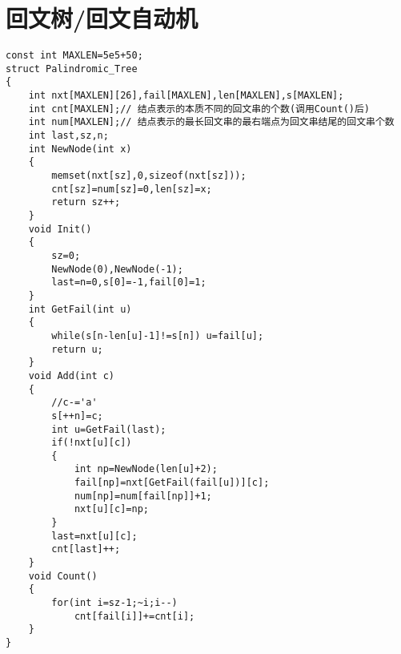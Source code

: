 \section{回文树/回文自动机}
\begin{lstlisting}
const int MAXLEN=5e5+50;
struct Palindromic_Tree
{
    int nxt[MAXLEN][26],fail[MAXLEN],len[MAXLEN],s[MAXLEN];
    int cnt[MAXLEN];// 结点表示的本质不同的回文串的个数(调用Count()后) 
    int num[MAXLEN];// 结点表示的最长回文串的最右端点为回文串结尾的回文串个数 
    int last,sz,n;
    int NewNode(int x)
    {
        memset(nxt[sz],0,sizeof(nxt[sz]));
        cnt[sz]=num[sz]=0,len[sz]=x;
        return sz++;
    }
    void Init()
    {
        sz=0;
        NewNode(0),NewNode(-1);
        last=n=0,s[0]=-1,fail[0]=1;
    }
    int GetFail(int u)
    {
        while(s[n-len[u]-1]!=s[n]) u=fail[u];
        return u;
    }
    void Add(int c)
    {
        //c-='a'
        s[++n]=c;
        int u=GetFail(last);
        if(!nxt[u][c])
        {
            int np=NewNode(len[u]+2);
            fail[np]=nxt[GetFail(fail[u])][c];
            num[np]=num[fail[np]]+1;
            nxt[u][c]=np;
        }
        last=nxt[u][c];
        cnt[last]++;
    }
    void Count()
    {
        for(int i=sz-1;~i;i--)
            cnt[fail[i]]+=cnt[i];
    }
}
\end{lstlisting}

